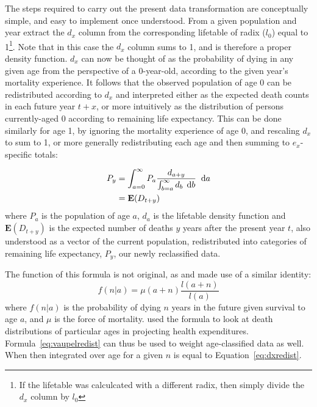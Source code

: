  \FloatBarrier
\label{sec:thetransformation}
The steps required to carry out the present data transformation are conceptually
simple, and easy to implement once understood. From a given
population and year extract the $d_x$ column from the corresponding lifetable of
radix ($l_0$) equal to 1\footnote{If the lifetable was calculcated with a
different radix, then simply divide the $d_x$ column by $l_0$}. Note that in
this case the $d_x$ column sums to 1, and is therefore a proper density function. 
$d_x$ can now be thought of as the probability of dying in any given age from the
 perspective of a 0-year-old, according to the given year's mortality
 experience. It follows that the observed population of age 0 can be
 redistributed according to $d_x$ and interpreted either as the expected death
 counts in each future year
$t+x$, or more intuitively as the distribution of persons currently-aged 0 according 
to remaining life expectancy. This can be done similarly for age 1, by ignoring the 
mortality experience of age 0, and rescaling $d_x$ to
sum to 1, or more generally redistributing each age and then summing to
$e_x$-specific totals:

\begin{align}
\label{eq:dxredist}
P_{y} &= \int _{a = 0} ^{\infty} P_a \frac{d_{a + y}}{\int _{b
= a} ^{\infty} d_b\, \; \mathrm{d} b} \;\; \mathrm{d} a
\\
&= \mathbf{E}(D_{t+y}) \notag
\end{align}
where $P_a$ is the population of age $a$, $d_a$ is the
lifetable density function and $\mathbf{E}(D_{t+y})$ is the expected number of
deaths $y$ years after the present year $t$, also understood as a vector of the
current population, redistributed into categories of remaining life expectancy,
$P_{y}$, our newly reclassified data.

The function of this formula is not original, as
\citet{miller2001increasing} and \citet{vaupel2009life} made use of a similar
identity:
\begin{equation}
\label{eq:vaupelredist}
f(n | a) = \mu (a+n) \frac{l(a+n)}{l(a)}
\end{equation}
where $f(n | a) $ is the probability of dying $n$ years in the future given
survival to age $a$, and $\mu$ is the force of mortality.
\citet{miller2001increasing} used the formula to look at death distributions of
particular ages in projecting health expenditures.
Formula~\eqref{eq:vaupelredist} can thus be used to weight age-classified data
as well. When then integrated over age for a given $n$ is equal to
Equation~\eqref{eq:dxredist}.

